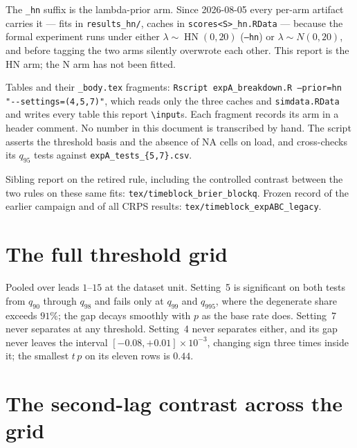 \documentclass[11pt]{article}
\newcommand{\code}[1]{\texttt{#1}}
\DeclareMathOperator{\hn}{HN}
\newcommand{\tblpath}{../../code/analysis/time_block_forecast/simstudy/output/tables}
\newcommand{\tbl}[1]{}
\begin{document}
The \code{\_hn} suffix is the lambda-prior arm. Since 2026-08-05 every
per-arm artifact carries it --- fits in \code{results\_hn/}, caches in
\code{scores<S>\_hn.RData} --- because the formal experiment runs under
either $\lambda \sim \hn(0, 20)$ (\code{--hn}) or $\lambda \sim N(0, 20)$,
and before tagging the two arms silently overwrote each other. This report
is the HN arm; the N arm has not been fitted.

Tables and their \code{\_body.tex} fragments:
\code{Rscript expA\_breakdown.R --prior=hn "-{}-settings=(4,5,7)"}, which
reads only the three caches and \code{simdata.RData} and writes every
table this report \code{\textbackslash input}s. Each fragment records its arm in a
header comment. No number in this document is transcribed by hand. The script asserts the threshold basis and the absence of NA
cells on load, and cross-checks its $q_{95}$ tests against
\code{expA\_tests\_\{5,7\}.csv}.

Sibling report on the retired rule, including the controlled contrast
between the two rules on these same fits:
\code{tex/timeblock\_brier\_blockq}. Frozen record of the earlier
campaign and of all CRPS results:
\code{tex/timeblock\_expABC\_legacy}.

\appendix
\section{The full threshold grid}

\tbl{expA_qsweep_full}

\noindent Pooled over leads $1$--$15$ at the dataset unit. Setting~5 is
significant on both tests from $q_{90}$ through $q_{98}$ and fails only
at $q_{99}$ and $q_{995}$, where the degenerate share exceeds $91\%$;
the gap decays smoothly with $p$ as the base rate does. Setting~7 never
separates at any threshold. Setting~4 never separates either, and its
gap never leaves the interval $[-0.08, +0.01] \times 10^{-3}$, changing
sign three times inside it; the smallest $t\,p$ on its eleven rows is
$0.44$.


\section{The second-lag contrast across the grid}
\label{sec:sweep-ar2ar1}
\end{document}
